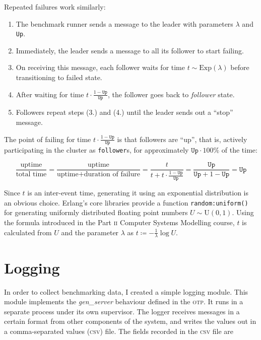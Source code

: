 \documentclass[11pt,chapterprefix=true,toc=bibliography,numbers=noendperiod,
               footnotes=multiple,twoside]{scrreprt}
\begin{document}
Repeated failures work similarly:

\begin{enumerate}
    \item The benchmark runner sends a message to the leader with parameters \(\lambda\) and \texttt{Up}.
    \item Immediately, the leader sends a message to all its follower to start failing.
    \item On receiving this message, each follower waits for time \(t \sim \text{Exp}(\lambda)\) before transitioning to failed state.
    \item After waiting for time \(t \cdot \frac{1 - \texttt{Up}}{\texttt{Up}}\), the follower goes back to \textit{follower} state.
    \item Followers repeat steps (3.) and (4.) until the leader sends out a \enquote{stop} message.
\end{enumerate}

The point of failing for time \(t \cdot \frac{1 - \texttt{Up}}{\texttt{Up}}\) is that followers are \enquote{up}, that is, actively participating in the cluster as \texttt{follower}s, for approximately \(\texttt{Up} \cdot 100\%\) of the time:

\[ \frac{\text{uptime}}{\text{total time}}
 = \frac{\text{uptime}}{\text{uptime} + \text{duration of failure}}
 = \frac{t}{t + t \cdot \frac{1-\texttt{Up}}{\texttt{Up}}}
 = \frac{\texttt{Up}}{\texttt{Up} + 1 - \texttt{Up}} = \texttt{Up} \]

Since \(t\) is an inter-event time, generating it using an exponential distribution is an obvious choice. Erlang's core libraries provide a function \texttt{random:uniform()} for generating uniformly distributed floating point numbers \(U \sim \text{U}(0,1)\). Using the formula introduced in the Part \textsc{ii} Computer Systems Modelling course, \(t\) is calculated from \(U\) and the parameter \(\lambda\) as \(t \coloneqq -\frac{1}{\lambda}\log{U}\).

\section{Logging}

In order to collect benchmarking data, I created a simple logging module. This module implements the \emph{gen\_server} behaviour defined in the \textsc{otp}. It runs in a separate process under its own supervisor. The logger receives messages in a certain format from other components of the system, and writes the values out in a comma-separated values (\textsc{csv}) file. The fields recorded in the \textsc{csv} file are
\end{document}
